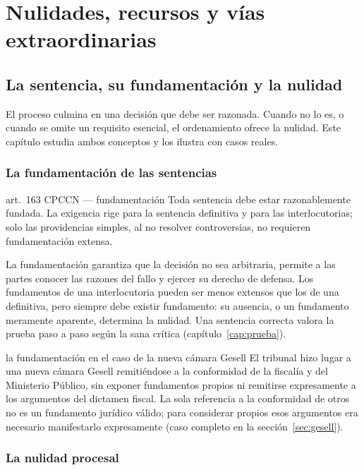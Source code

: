 \documentclass[12pt,oneside]{book}
\begin{document}
\part{Nulidades, recursos y vías extraordinarias}

\chapter{La sentencia, su fundamentación y la nulidad}\label{cap:sentencia}

El proceso culmina en una decisión que debe ser razonada. Cuando no lo es, o cuando se omite un requisito esencial, el ordenamiento ofrece la nulidad. Este capítulo estudia ambos conceptos y los ilustra con casos reales.

\section{La fundamentación de las sentencias}

\begin{regla}{art.~163 CPCCN --- fundamentación}
Toda sentencia debe estar razonablemente fundada. La exigencia rige para la sentencia definitiva y para las interlocutorias; solo las providencias simples, al no resolver controversias, no requieren fundamentación extensa.
\end{regla}

La fundamentación garantiza que la decisión no sea arbitraria, permite a las partes conocer las razones del fallo y ejercer su derecho de defensa. Los fundamentos de una interlocutoria pueden ser menos extensos que los de una definitiva, pero siempre debe existir fundamento: su ausencia, o un fundamento meramente aparente, determina la nulidad. Una sentencia correcta valora la prueba paso a paso según la sana crítica (capítulo~\ref{cap:prueba}).

\begin{ejemplo}{la fundamentación en el caso de la nueva cámara Gesell}
El tribunal hizo lugar a una nueva cámara Gesell remitiéndose a la conformidad de la fiscalía y del Ministerio Público, sin exponer fundamentos propios ni remitirse expresamente a los argumentos del dictamen fiscal. La sola referencia a la conformidad de otros no es un fundamento jurídico válido; para considerar propios esos argumentos era necesario manifestarlo expresamente (caso completo en la sección~\ref{sec:gesell}).
\end{ejemplo}

\section{La nulidad procesal}
\end{document}
